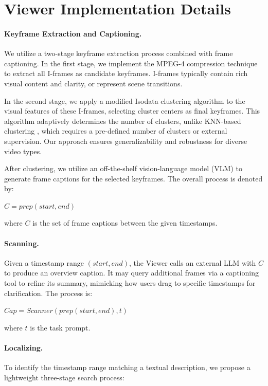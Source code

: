 \section{Viewer Implementation Details}
\label{appendix_viewer}

\paragraph{Keyframe Extraction and Captioning.} 
We utilize a two-stage keyframe extraction process combined with frame captioning. In the first stage, we implement the MPEG-4 compression technique \citep{mpeg} to extract all I-frames as candidate keyframes. I-frames typically contain rich visual content and clarity, or represent scene transitions.

In the second stage, we apply a modified Isodata clustering algorithm to the visual features of these I-frames, selecting cluster centers as final keyframes. This algorithm adaptively determines the number of clusters, unlike KNN-based clustering \citep{wang2024videotreeadaptivetreebasedvideo, clustering_knn}, which requires a pre-defined number of clusters or external supervision. Our approach ensures generalizability and robustness for diverse video types.

After clustering, we utilize an off-the-shelf vision-language model (VLM) to generate frame captions for the selected keyframes. The overall process is denoted by:
\begin{center}
$C = prep(start, end)$
\end{center}
where $C$ is the set of frame captions between the given timestamps.

\paragraph{Scanning.} 
Given a timestamp range $(start, end)$, the Viewer calls an external LLM with $C$ to produce an overview caption. It may query additional frames via a captioning tool to refine its summary, mimicking how users drag to specific timestamps for clarification. The process is:
\begin{center}
$Cap = Scanner(prep(start, end), t)$
\end{center}
where $t$ is the task prompt.

\paragraph{Localizing.} 
To identify the timestamp range matching a textual description, we propose a lightweight three-stage search process:

